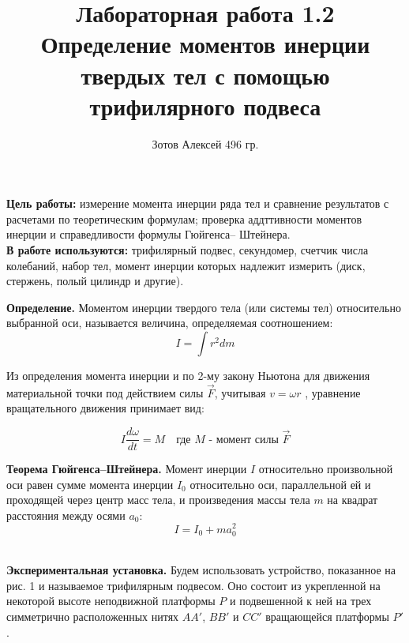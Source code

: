 \documentclass[12pt]{article}
\begin{document}
    \author {Зотов Алексей 496 гр.}
    \title {Лабораторная работа 1.2 \\ Определение моментов инерции твердых тел с помощью трифилярного подвеса}
    \maketitle{}   
    \newline \newline
    
    \indent
    \textbf{Цель работы:} измерение момента инерции ряда тел и сравнение результатов с расчетами по теоретическим формулам; проверка аддттивности моментов инерции и справедливости формулы Гюйгенса– Штейнера.
    \\\newline
    \indent
    \textbf{В работе используются:} трифилярный подвес, секундомер, счетчик числа колебаний, набор тел, момент инерции которых надлежит измерить (диск, стержень, полый цилиндр и другие).
    \\\newline
    
    \textbf{Определение.} Моментом инерции твердого тела (или системы тел) относительно выбранной оси, называется величина, определяемая соотношением: 
    \begin{equation}
              I = \int r^2dm
    \end{equation} 
    
    Из определения момента инерции и по 2-му закону Ньютона для движения материальной точки под действием силы $\vec{F}$, учитывая $v = \omega r$ , уравнение вращательного движения принимает вид:

    \begin{equation}
              I \frac{d\omega}{dt} = M \quad \text{где $M$ - момент силы $\vec{F}$}
    \end{equation} 

    \textbf{Теорема Гюйгенса–Штейнера.} Момент инерции $I$ относительно произвольной оси равен сумме момента инерции $I_0$ относительно оси, параллельной ей и проходящей через центр масс тела, и произведения массы тела $m$ на квадрат расстояния между осями $a_0$:
    \begin{equation}
        I = I_0 + ma^2_0
    \end{equation} \\\newline

    \textbf{Экспериментальная установка.} Будем использовать устройство, показанное на рис. 1 и называемое трифилярным подвесом. Оно состоит из укрепленной на некоторой высоте неподвижной платформы $P$ и подвешенной к ней на трех симметрично расположенных нитях $AA'$, $BB'$ и $CC'$ вращающейся платформы $P'$.
\end{document}
